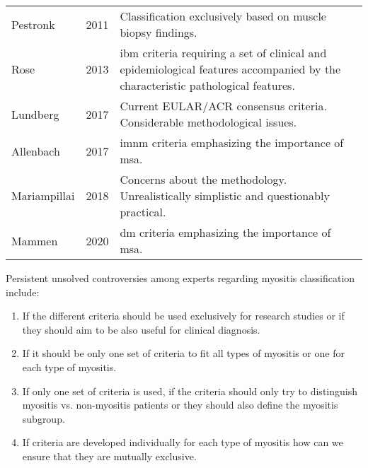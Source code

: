 \begin{table}
{\begin{tabular}{|l|l|p{}|}
		Pestronk\cite{Pestronk2011}           & 2011 & Classification exclusively based on muscle biopsy findings.                                                                                                             \\
		Rose\cite{Rose2013}                   & 2013 & \gls{ibm} criteria requiring a set of clinical and epidemiological features accompanied by the characteristic pathological features.                                    \\
		Lundberg\cite{Lundberg2017}           & 2017 & Current EULAR/ACR consensus criteria. Considerable methodological issues.                                                                                               \\
		Allenbach\cite{Allenbach2017}         & 2017 & \Glsdesc{imnm} criteria emphasizing the importance of \gls{msa}.                                                                                                        \\
		Mariampillai\cite{Mariampillai2018}   & 2018 & Concerns about the methodology. Unrealistically simplistic and questionably practical.                                                                                  \\
		Mammen\cite{Mammen2020}               & 2020 & \gls{dm} criteria emphasizing the importance of \gls{msa}.                                                                                                              \\ \hline
	\end{tabular}}
	\label{tab:classifications}
\end{table}

Persistent unsolved controversies among experts regarding myositis classification include:
 
\begin{enumerate}
	\item If the different criteria should be used exclusively for research studies or if they should aim to be also useful for clinical diagnosis.
	
	\item If it should be only one set of criteria to fit all types of myositis or one for each type of myositis.
	
	\item If only one set of criteria is used, if the criteria should only try to distinguish myositis vs. non-myositis patients or they should also define the myositis subgroup.
	
	\item If criteria are developed individually for each type of myositis how can we ensure that they are mutually exclusive. 
\end{enumerate}

